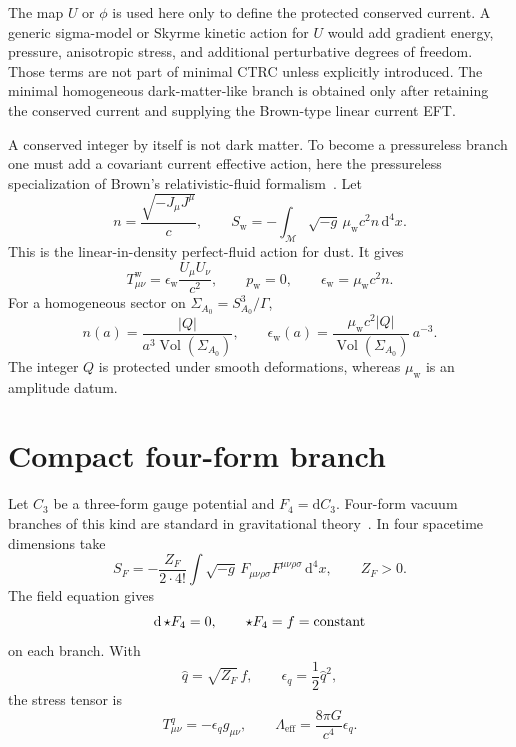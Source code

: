 \documentclass[
  aps,
  prd,
  reprint,
  superscriptaddress,
  floatfix,
  nofootinbib,
  longbibliography
]{revtex4-2}
\theoremstyle{plain}
\theoremstyle{definition}
\theoremstyle{remark}
\newcommand{\dd}{\mathrm d}
\newcommand{\M}{\mathcal M}
\newcommand{\w}{\mathrm w}
\newcommand{\eff}{\mathrm{eff}}
\newcommand{\Vol}{\operatorname{Vol}}
\newcommand{\eps}{\epsilon}
\newcommand{\qhat}{\widehat q}
\begin{document}
The map \(U\) or \(\phi\) is used here only to define the protected conserved
current.  A generic sigma-model or Skyrme kinetic action for \(U\) would add
gradient energy, pressure, anisotropic stress, and additional perturbative
degrees of freedom.  Those terms are not part of minimal CTRC unless explicitly
introduced.  The minimal homogeneous dark-matter-like branch is obtained only
after retaining the conserved current and supplying the Brown-type linear
current EFT.

A conserved integer by itself is not dark matter.  To become a pressureless branch one must add a covariant current effective action, here the pressureless specialization of Brown's relativistic-fluid formalism~\cite{BrownFluid}.  Let
\begin{equation}
n=\frac{\sqrt{-J_\mu J^\mu}}{c},
\qquad
S_{\w}=-\int_{\M}\sqrt{-g}\,\mu_{\w}c^2 n\,\dd^4x .
\label{eq:dust_current_action}
\end{equation}
This is the linear-in-density perfect-fluid action for dust.  It gives
\begin{equation}
T^{\w}_{\mu\nu}=\eps_{\w}\frac{U_\mu U_\nu}{c^2},
\qquad
p_{\w}=0,
\qquad
\eps_{\w}=\mu_{\w}c^2 n .
\label{eq:dust_stress}
\end{equation}
For a homogeneous sector on \(\Sigma_{A_0}=S^3_{A_0}/\Gamma\),
\begin{equation}
n(a)=\frac{|Q|}{a^3\Vol(\Sigma_{A_0})},
\qquad
\eps_{\w}(a)=
\frac{\mu_{\w}c^2|Q|}{\Vol(\Sigma_{A_0})}\,a^{-3}.
\label{eq:winding_density}
\end{equation}
The integer \(Q\) is protected under smooth deformations, whereas \(\mu_{\w}\) is an amplitude datum.

\section{Compact four-form branch}

Let \(C_3\) be a three-form gauge potential and \(F_4=\dd C_3\).  Four-form vacuum branches of this kind are standard in gravitational theory~\cite{Aurilia,HenneauxTeitelboim,BrownTeitelboim,BoussoPolchinski}.  In four spacetime dimensions take
\begin{equation}
S_F=-\frac{Z_F}{2\cdot4!}
\int\sqrt{-g}\,
F_{\mu\nu\rho\sigma}F^{\mu\nu\rho\sigma}\,\dd^4x,
\qquad Z_F>0 .
\label{eq:four_form_action}
\end{equation}
The field equation gives
\begin{equation}
\dd\,{\star F_4}=0,
\qquad
{\star F_4}=f=\hbox{constant}
\label{eq:four_form_solution}
\end{equation}
on each branch.  With
\begin{equation}
\qhat=\sqrt{Z_F}\,f,
\qquad
\eps_q=\frac12\qhat^2,
\label{eq:four_form_energy}
\end{equation}
the stress tensor is
\begin{equation}
T^q_{\mu\nu}=-\eps_q g_{\mu\nu},
\qquad
\Lambda_{\eff}=\frac{8\pi G}{c^4}\eps_q .
\label{eq:four_form_stress}
\end{equation}
\end{document}
